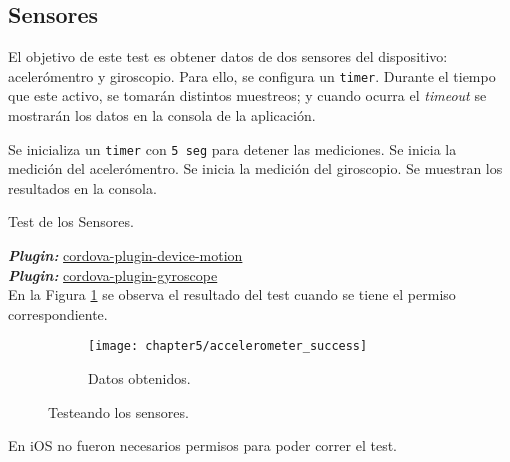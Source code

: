 \subsection{Sensores}
El objetivo de este test es obtener datos de dos sensores del dispositivo: acelerómentro y giroscopio. Para ello, se configura un \texttt{timer}. Durante el tiempo que este activo, se tomarán distintos muestreos; y cuando ocurra el \emph{timeout} se mostrarán los datos en la consola de la aplicación.\\
\begin{algorithm}
	\begin{algorithmic}[1]
		\STATE Se inicializa un \texttt{timer} con \texttt{5 seg} para detener las mediciones.
		\STATE Se inicia la medición del acelerómentro.
		\STATE Se inicia la medición del giroscopio.
		\STATE Se muestran los resultados en la consola.
	\end{algorithmic}
	\caption{Test de los Sensores.}\label{alg:chap5_test_sensors}
\end{algorithm}
\textbf{\emph{Plugin:}} \href{https://www.npmjs.com/package/cordova-plugin-device-motion}{cordova-plugin-device-motion}\\
\textbf{\emph{Plugin:}} \href{https://www.npmjs.com/package/cordova-plugin-gyroscope}{cordova-plugin-gyroscope}\\
En la Figura \ref{fig:ch05:accelerometer_success} se observa el resultado del test cuando se tiene el permiso correspondiente.\\
\begin{figure}[hbtp]
    \centering
	\begin{subfigure}{.3\linewidth}
	    \centering
		\texttt{[image: chapter5/accelerometer\_success]}
		\caption{Datos obtenidos.}
		\label{fig:ch05:accelerometer_success}
	\end{subfigure}
	\caption{Testeando los sensores.}
	\label{fig:chapter05:sensors_test}
\end{figure}
En iOS no fueron necesarios permisos para poder correr el test.

